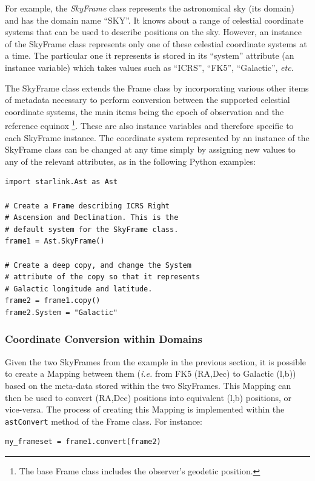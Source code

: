\documentclass[final,authoryear,5p,times,twocolumn]{elsarticle}
\begin{document}
For example, the \emph{SkyFrame} class represents the astronomical sky (its
domain) and has the domain name ``SKY''. It knows about a range of celestial
coordinate systems that can be used to describe positions on the sky.
However, an instance of the SkyFrame class represents only one of these
celestial coordinate systems at a time. The particular one it represents is
stored in its ``system'' attribute (an instance variable) which takes
values such as ``ICRS'', ``FK5'', ``Galactic'', \emph{etc.}

The SkyFrame class extends the Frame class by incorporating various other
items of metadata necessary to perform conversion between the supported
celestial coordinate systems, the main items being the epoch of observation
and the reference equinox \footnote{The base Frame class includes the
observer's geodetic position.}. These are also instance variables and
therefore specific to each SkyFrame instance. The coordinate system
represented by an instance of the SkyFrame class can be changed at any time
simply by assigning new values to any of the relevant attributes, as in
the following Python examples:

\begin{lstlisting}
import starlink.Ast as Ast

# Create a Frame describing ICRS Right
# Ascension and Declination. This is the
# default system for the SkyFrame class.
frame1 = Ast.SkyFrame()

# Create a deep copy, and change the System
# attribute of the copy so that it represents
# Galactic longitude and latitude.
frame2 = frame1.copy()
frame2.System = "Galactic"
\end{lstlisting}

\subsubsection{Coordinate Conversion within Domains}
\label{sec:domConversion}
Given the two SkyFrames from the example in the previous section, it is
possible to create a Mapping between them (\emph{i.e.} from FK5 (RA,Dec)
to Galactic (l,b)) based on the meta-data stored within the two
SkyFrames. This Mapping can then be used to convert (RA,Dec) positions
into equivalent (l,b) positions, or vice-versa. The process of creating
this Mapping is implemented within the \texttt{astConvert} method of the
Frame class. For instance:

\begin{lstlisting}
my_frameset = frame1.convert(frame2)
\end{lstlisting}
\end{document}

